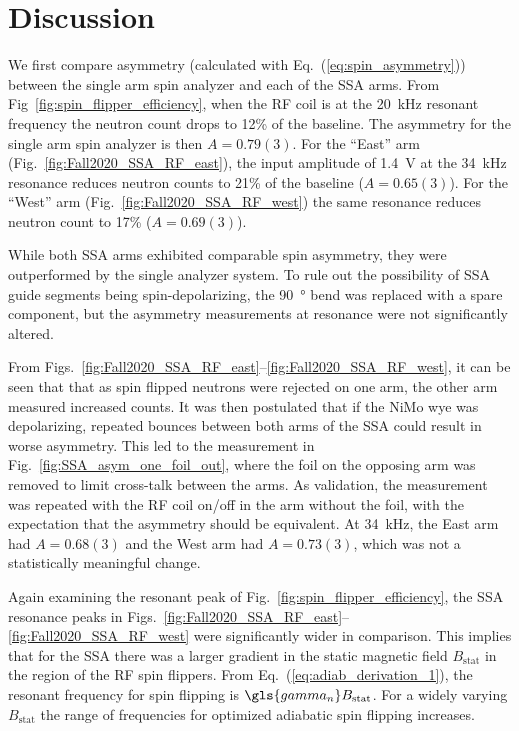 
\section{Discussion}


We first compare asymmetry (calculated with Eq.~(\ref{eq:spin_asymmetry})) between the single arm spin analyzer and each of the SSA arms. From Fig~\ref{fig:spin_flipper_efficiency}, when the RF coil is at the \qty{20}{kHz} resonant frequency the neutron count drops to 12\% of the baseline. The asymmetry for the single arm spin analyzer is then $A= 0.79(3)$. For the ``East'' arm (Fig.~\ref{fig:Fall2020_SSA_RF_east}), the input amplitude of \qty{1.4}{V} at the \qty{34}{kHz} resonance reduces neutron counts to 21\% of the baseline ($A=0.65(3)$). For the ``West'' arm (Fig.~\ref{fig:Fall2020_SSA_RF_west}) the same resonance reduces neutron count to 17\% ($A=0.69(3)$). 

While both SSA arms exhibited comparable spin asymmetry, they were outperformed by the single analyzer system. To rule out the possibility of SSA guide segments being spin-depolarizing, the \qty{90}{\degree} bend was replaced with a spare component, but the asymmetry measurements at resonance were not significantly altered.

From Figs.~\ref{fig:Fall2020_SSA_RF_east}--\ref{fig:Fall2020_SSA_RF_west}, it can be seen that that as spin flipped neutrons were rejected on one arm, the other arm measured increased counts. It was then postulated that if the NiMo wye was depolarizing, repeated \ucn bounces between both arms of the SSA could result in worse asymmetry. This led to the measurement in Fig.~\ref{fig:SSA_asym_one_foil_out}, where the foil on the opposing arm was removed to limit cross-talk between the arms. As validation, the measurement was repeated with the RF coil on/off in the arm without the foil, with the expectation that the asymmetry should be equivalent. At \qty{34}{kHz}, the East arm had $A=0.68(3)$ and the West arm had $A=0.73(3)$, which was not a statistically meaningful change.

Again examining the resonant peak of Fig.~\ref{fig:spin_flipper_efficiency}, the SSA resonance peaks in Figs.~\ref{fig:Fall2020_SSA_RF_east}--\ref{fig:Fall2020_SSA_RF_west} were significantly wider in comparison. This implies that for the SSA there was a larger gradient in the static magnetic field $B_\text{stat}$ in the region of the RF spin flippers. From Eq.~(\ref{eq:adiab_derivation_1}), the resonant frequency for spin flipping is $\gls{gamma_n} B_\text{stat}$. For a widely varying $B_\text{stat}$ the range of frequencies for optimized adiabatic spin flipping increases.

